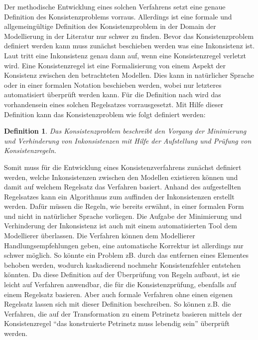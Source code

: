 Der methodische Entwicklung eines solchen Verfahrens setzt eine genaue Definition des Konsistenzproblems vorraus.
Allerdings ist eine formale und allgemeingültige Definition des Konsistenzproblem in der Domain der Modellierung in der Literatur nur schwer zu finden.
Bevor das Konsistenzproblem definiert werden kann muss zunächst beschieben werden was eine Inkonsistenz ist.
Laut \cite{Nuseibeh1996} tritt eine Inkonsistenz genau dann auf, wenn eine Konsistenzregel verletzt wird.
Eine Konsistenzregel ist eine Formalisierung von einem Aspekt der Konsistenz zwischen den betrachteten Modellen.
Dies kann in natürlicher Sprache oder in einer formalen Notation beschieben werden, wobei nur letzteres automatisiert überprüft werden kann.
Für die Definition nach \cite{Nuseibeh1996} wird das vorhandensein eines solchen Regelsatzes vorrausgesetzt.
Mit Hilfe dieser Definition kann das Konsistenzproblem wie folgt definiert werden:

\newtheorem*{konsistenzproblem}{Definition}

\begin{konsistenzproblem}
    Das Konsistenzproblem beschreibt den Vorgang der Minimierung und Verhinderung von Inkonsistenzen mit Hilfe der Aufstellung und Prüfung von Konsistenzregeln.
\end{konsistenzproblem}

Somit muss für die Entwicklung eines Konsistenzverfahrens zunächst definiert werden, welche Inkonsistenzen zwischen den Modellen existieren können und damit auf welchem Regelsatz das Verfahren basiert.
Anhand des aufgestellten Regelsatzes kann ein Algorithmus zum auffinden der Inkonsistenzen erstellt werden.
Dafür müssen die Regeln, wie bereits erwähnt, in einer formalen Form und nicht in natürlicher Sprache vorliegen.
Die Aufgabe der Minimierung und Verhinderung der Inkonsistenz ist auch mit einem automatisierten Tool dem Modellierer überlassen.
Die Verfahren können dem Modellierer Handlungsempfehlungen geben, eine automatische Korrektur ist allerdings nur schwer möglich.
So könnte ein Problem zB. durch das entfernen eines Elementes behoben werden, wodurch kaskadierend nochmehr Konsistenzfehler entstehen könnten.
Da diese Definition auf der Überprüfung von Regeln aufbaut, ist sie leicht auf Verfahren anwendbar, die für die Konsistenzprüfung, ebenfalls auf einem Regelsatz basieren.
Aber auch formale Verfahren ohne einen eigenen Regelsatz lassen sich mit dieser Definition beschreiben.
So können z.B. die Verfahren, die auf der Transformation zu einem Petrinetz basieren mittels der Konsistenzregel ``das konstruierte Petrinetz muss lebendig sein'' überprüft werden.

